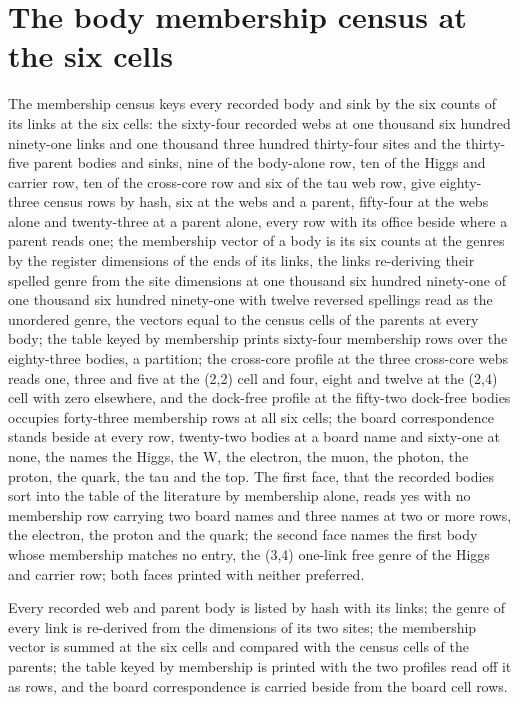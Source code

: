 \section{The body membership census at the six cells}\label{mod:IV-8e-D542297-the-body-membership-census-at-the-six-cells}
\begin{chtable}
The membership census keys every recorded body and sink by the six counts of its links at the six cells: the sixty-four recorded webs at one thousand six hundred ninety-one links and one thousand three hundred thirty-four sites and the thirty-five parent bodies and sinks, nine of the body-alone row, ten of the Higgs and carrier row, ten of the cross-core row and six of the tau web row, give eighty-three census rows by hash, six at the webs and a parent, fifty-four at the webs alone and twenty-three at a parent alone, every row with its office beside where a parent reads one; the membership vector of a body is its six counts at the genres by the register dimensions of the ends of its links, the links re-deriving their spelled genre from the site dimensions at one thousand six hundred ninety-one of one thousand six hundred ninety-one with twelve reversed spellings read as the unordered genre, the vectors equal to the census cells of the parents at every body; the table keyed by membership prints sixty-four membership rows over the eighty-three bodies, a partition; the cross-core profile at the three cross-core webs reads one, three and five at the (2,2) cell and four, eight and twelve at the (2,4) cell with zero elsewhere, and the dock-free profile at the fifty-two dock-free bodies occupies forty-three membership rows at all six cells; the board correspondence stands beside at every row, twenty-two bodies at a board name and sixty-one at none, the names the Higgs, the W, the electron, the muon, the photon, the proton, the quark, the tau and the top. The first face, that the recorded bodies sort into the table of the literature by membership alone, reads yes with no membership row carrying two board names and three names at two or more rows, the electron, the proton and the quark; the second face names the first body whose membership matches no entry, the (3,4) one-link free genre of the Higgs and carrier row; both faces printed with neither preferred.
\end{chtable}
\chdeps{}{}
Every recorded web and parent body is listed by hash with its links; the genre of every link is re-derived from the dimensions of its two sites; the membership vector is summed at the six cells and compared with the census cells of the parents; the table keyed by membership is printed with the two profiles read off it as rows, and the board correspondence is carried beside from the board cell rows.

